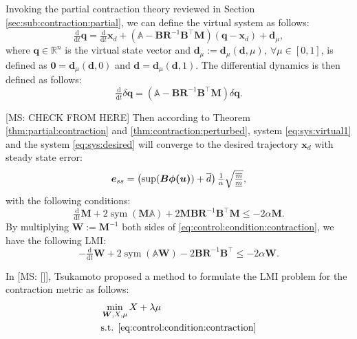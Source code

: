 \documentclass{ifacconf}
\newcommand{\MSRY}[1]{{\color{Peach} [MS: #1]}} %
\newcommand\R{\mathbb{R}}
\newcommand*{\mv}[1]{\boldsymbol{#1}} %
\newcommand*{\mm}[1]{\boldsymbol{#1}} %
\DeclareMathOperator{\mysym}{sym}       %
\newcommand\der{\mathrm d}
\newcommand*{\ddtt}{
   \tfrac{\der}{\der t}
}
\begin{document}
Invoking the partial contraction theory reviewed in Section \ref{sec:sub:contraction:partial}, we can define the virtual system as follows:
\begin{equation} \label{eq:sys:virtual1}
   \ddtt\mv{q}
   =
   \ddtt\mv{x}_d
   +
   \left(
      \mathbb{A} - \mm{B}\mm{R}^{-1} \mm{B}^\top \mm{M}
   \right)
   (\mv{q} - \mv{x}_d)
   +
   \mv{d}_{\mu}
   ,
\end{equation}
where $\mv{q}\in\R^n$ is the virtual state vector and $\mv{d}_{\mu}:=\mv{d}_{\mu}(\mv{d},\mu),\ \forall \mu\in[0,1]$, is defined as $\mv{0} = \mv{d}_{\mu}(\mv{d},0)$ and $\mv{d} = \mv{d}_{\mu}(\mv{d},1)$.
The differential dynamics is then defined as follows:
\begin{equation} \label{eq:sys:virtual2}
   \ddtt{\delta{\mv{q}}}
   =
   \left(
      \mathbb{A} - \mm{B}\mm{R}^{-1} \mm{B}^\top \mm{M}
   \right)
   \delta{\mv{q}}
   .
\end{equation}

\MSRY{CHECK FROM HERE}
Then according to Theorem \ref{thm:partial:contraction} and \ref{thm:contraction:perturbed}, system \eqref{eq:sys:virtual1} and the system \eqref{eq:sys:desired} will converge to the desired trajectory $\mv{x}_d$ with steady state error:
\begin{equation} \label{eq:ss:error}
   \mv{e}_{\rm{ss}}
   =
   \left(
      \sup({\mm{B}\mv{\phi(\mv{u})}})+\overline d
   \right)
   \tfrac{1}{\alpha}
   \sqrt{\tfrac{\overline m}{\underline{m}}}
   ,
\end{equation}
with the following conditions:
\begin{equation} \label{eq:control:condition:contraction}
   \ddtt\mm{M}
   +
   2\mysym(
      \mm{M}\mathbb{A}
   )
   +
   2\mm{M}\mm{B}\mm{R}^{-1} \mm{B}^\top \mm{M}
   \leq
   -2\alpha\mm{M}
   .
\end{equation}
By multiplying $\mm{W}:=\mm{M}^{-1}$ both sides of \eqref{eq:control:condition:contraction}, we have the following LMI:
\begin{equation} \label{eq:control:condition:contraction:LMI}
   -
   \ddtt\mm{W}
   +
   2\mysym(
      \mathbb{A}\mm{W}
   )
   -
   2\mm{B}\mm{R}^{-1} \mm{B}^\top 
   \leq
   -2\alpha\mm{W}
   .
\end{equation}

In \MSRY{[]}, Tsukamoto \etal proposed a method to formulate the LMI problem for the contraction metric as follows:
\begin{equation}
   \begin{aligned}
      &\min_{\mm{W},X,\mu} X + \lambda \mu
      \\
      &\text{s.t. \eqref{eq:control:condition:contraction}}
   \end{aligned}
\end{equation}
\end{document}
